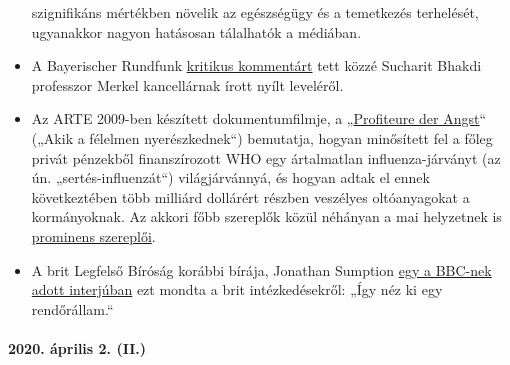 \begin{itemize}
  szignifikáns mértékben növelik az egészségügy és a temetkezés
  terhelését, ugyanakkor nagyon hatásosan tálalhatók a médiában.
\item
  A Bayerischer Rundfunk
  \href{https://www.br.de/nachrichten/wissen/bhakdis-brief-an-die-kanzlerin-was-ist-dran-an-seinen-fragen,RutYDhd}{kritikus
  kommentárt} tett közzé Sucharit Bhakdi professzor Merkel kancellárnak
  írott nyílt leveléről.
\item
  Az ARTE 2009-ben készített dokumentumfilmje, a
  „\href{https://vimeo.com/403175258}{Profiteure der Angst}`` („Akik a
  félelmen nyerészkednek``) bemutatja, hogyan minősített fel a főleg
  privát pénzekből finanszírozott WHO egy ártalmatlan influenza-járványt
  (az ún. „sertés-influenzát``) világjárvánnyá, és hogyan adtak el ennek
  következtében több milliárd dollárért részben veszélyes oltóanyagokat
  a kormányoknak. Az akkori főbb szereplők közül néhányan a mai
  helyzetnek is
  \href{https://www.nature.com/articles/news.2009.424}{prominens
  szereplői}.
\item
  A brit Legfelső Bíróság korábbi bírája, Jonathan Sumption
  \href{https://www.spectator.co.uk/article/former-supreme-court-justice-this-is-what-a-police-state-is-like-}{egy
  a BBC-nek adott interjúban} ezt mondta a brit intézkedésekről: „Így
  néz ki egy rendőrállam.``
\end{itemize}

\hypertarget{2020-uxe1prilis-2-ii}{%
\paragraph{2020. április 2. (II.)}\label{2020-uxe1prilis-2-ii}}

